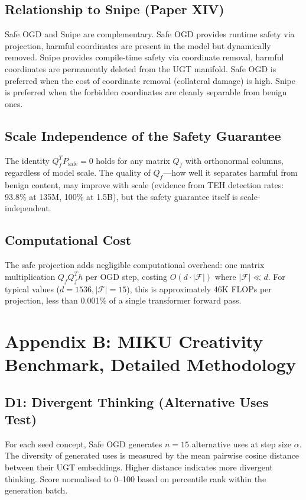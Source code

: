 \documentclass[11pt]{article}
\begin{document}
\subsection{Relationship to Snipe (Paper XIV)}

Safe OGD and Snipe are complementary. Safe OGD provides runtime safety via projection, harmful coordinates are present in the model but dynamically removed. Snipe provides compile-time safety via coordinate removal, harmful coordinates are permanently deleted from the UGT manifold. Safe OGD is preferred when the cost of coordinate removal (collateral damage) is high. Snipe is preferred when the forbidden coordinates are cleanly separable from benign ones.

\subsection{Scale Independence of the Safety Guarantee}

The identity $Q_f^T P_{\mathrm{safe}} = 0$ holds for any matrix $Q_f$ with orthonormal columns, regardless of model scale. The quality of $Q_f$---how well it separates harmful from benign content, may improve with scale (evidence from TEH detection rates: 93.8\% at 135M, 100\% at 1.5B), but the safety guarantee itself is scale-independent.

\subsection{Computational Cost}

The safe projection adds negligible computational overhead: one matrix multiplication $Q_f Q_f^T h$ per OGD step, costing $O(d \cdot |\mathcal{F}|)$ where $|\mathcal{F}| \ll d$. For typical values ($d=1536, |\mathcal{F}|=15$), this is approximately 46K FLOPs per projection, less than 0.001\% of a single transformer forward pass.


\section{Appendix B: MIKU Creativity Benchmark, Detailed Methodology}

\subsection{D1: Divergent Thinking (Alternative Uses Test)}

For each seed concept, Safe OGD generates $n=15$ alternative uses at step size $\alpha$. The diversity of generated uses is measured by the mean pairwise cosine distance between their UGT embeddings. Higher distance indicates more divergent thinking. Score normalised to 0--100 based on percentile rank within the generation batch.
\end{document}
